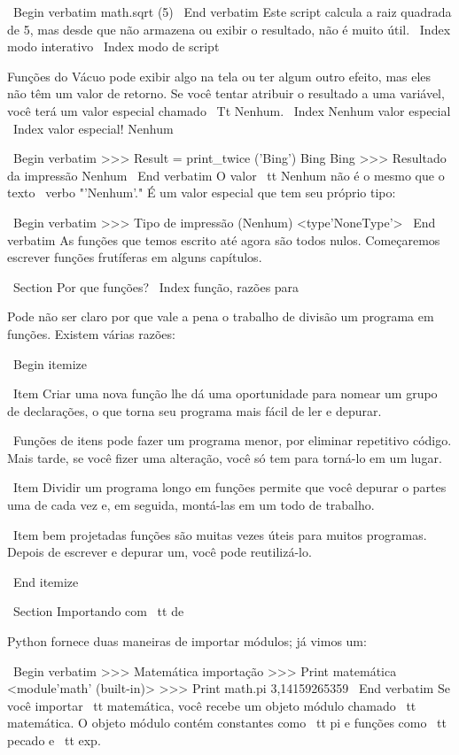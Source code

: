 \documentclass[10pt]{book}
\begin{document}
{\ Begin {verbatim}
math.sqrt (5)
\ End {verbatim}
%
Este script calcula a raiz quadrada de 5, mas desde que não armazena
ou exibir o resultado, não é muito útil.
\ Index {modo interativo}
\ Index {modo de script}

Funções do Vácuo pode exibir algo na tela ou ter algum
outro efeito, mas eles não têm um valor de retorno. Se você tentar
atribuir o resultado a uma variável, você terá um valor especial chamado
{\ Tt Nenhum}.
\ Index {Nenhum valor especial}
\ Index {valor especial! Nenhum}

\ Begin {verbatim}
>>> Result = print_twice ('Bing')
Bing
Bing
>>> Resultado da impressão
Nenhum
\ End {verbatim}
%
O valor {\ tt Nenhum} não é o mesmo que o texto \ verbo "'Nenhum'." 
É um valor especial que tem seu próprio tipo:

\ Begin {verbatim}
>>> Tipo de impressão (Nenhum)
<type'NoneType'>
\ End {verbatim}
%
As funções que temos escrito até agora são todos nulos. Começaremos
escrever funções frutíferas em alguns capítulos.


\ Section {Por que funções?}
\ Index {função, razões para}

Pode não ser claro por que vale a pena o trabalho de divisão
um programa em funções. Existem várias razões:

\ Begin {itemize}

\ Item Criar uma nova função lhe dá uma oportunidade para nomear um grupo
de declarações, o que torna seu programa mais fácil de ler e depurar.

\ Funções de itens pode fazer um programa menor, por eliminar repetitivo
código. Mais tarde, se você fizer uma alteração, você só tem
para torná-lo em um lugar.

\ Item Dividir um programa longo em funções permite que você depurar o
partes uma de cada vez e, em seguida, montá-las em um todo de trabalho.

\ Item bem projetadas funções são muitas vezes úteis para muitos programas.
Depois de escrever e depurar um, você pode reutilizá-lo.

\ End {itemize}


\ Section {Importando com {\ tt de}}

Python fornece duas maneiras de importar módulos; já vimos um:

\ Begin {verbatim}
>>> Matemática importação
>>> Print matemática
<module'math' (built-in)>
>>> Print math.pi
3,14159265359
\ End {verbatim}
%
Se você importar {\ tt matemática}, você recebe um objeto módulo chamado {\ tt matemática}.
O objeto módulo contém constantes como {\ tt pi} e funções
como {\ tt pecado} e {\ tt exp}.

}
\end{document}
